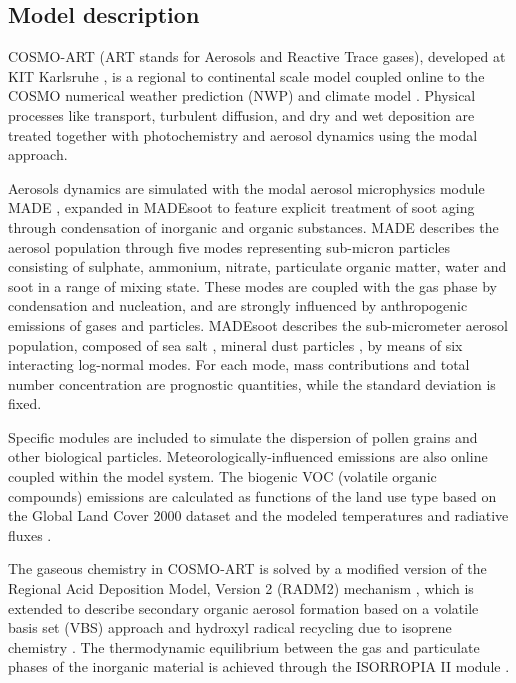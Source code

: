 \subsection{Model description}
\label{subsec:1.1}
COSMO-ART  (ART  stands  for   Aerosols  and  Reactive  Trace  gases),
developed  at  KIT  Karlsruhe  \citep{Vogel-2009}, is  a  regional  to
continental scale model coupled  online to the COSMO numerical weather
prediction  (NWP) and  climate  model \citep{Baldauf-2011}.   Physical
processes  like  transport,  turbulent  diffusion,  and  dry  and  wet
deposition  are  treated  together  with  photochemistry  and  aerosol
dynamics  using the  modal approach.  

Aerosols dynamics  are simulated  with the modal  aerosol microphysics
module  MADE \citep{Ackermann-1998}, expanded  in MADEsoot  to feature
explicit  treatment of  soot aging  through condensation  of inorganic
\citep{Riemer-2003} and organic substances. MADE describes the aerosol
population  through  five   modes  representing  sub-micron  particles
consisting of sulphate, ammonium, nitrate, particulate organic matter,
water and soot  \citep{Riemer-2004} in a range of  mixing state. These
modes are coupled  with the gas phase by  condensation and nucleation,
and are  strongly influenced by  anthropogenic emissions of  gases and
particles. MADEsoot  describes the sub-micrometer  aerosol population,
composed  of sea  salt \citep{Lundgren-2013},  mineral  dust particles
\citep{Vogel-2006,  Stanelle-2010},   by  means  of   six  interacting
log-normal modes.  For each  mode, mass contributions and total number
concentration are prognostic  quantities, while the standard deviation
is fixed.

Specific  modules are included  to simulate  the dispersion  of pollen
grains    \citep{Vogel-2008}   and    other    biological   particles.
Meteorologically-influenced emissions  are also online  coupled within
the  model  system.  The  biogenic  VOC  (volatile organic  compounds)
emissions are  calculated as functions of  the land use  type based on
the Global  Land Cover 2000  dataset and the modeled  temperatures and
radiative fluxes \citep{Vogel-1995}.

The gaseous chemistry in COSMO-ART  is solved by a modified version of
the  Regional  Acid  Deposition  Model, Version  2  (RADM2)  mechanism
\citep{Stockwell-1990},  which  is   extended  to  describe  secondary
organic aerosol formation based on a volatile basis set (VBS) approach
\citep{Athanasopoulou-2013}  and  hydroxyl  radical recycling  due  to
isoprene chemistry \citep{Geiger-2003}.  The thermodynamic equilibrium
between the  gas and particulate  phases of the inorganic  material is
achieved through the  ISORROPIA II module \citep{Fountoukis-2007}. 

